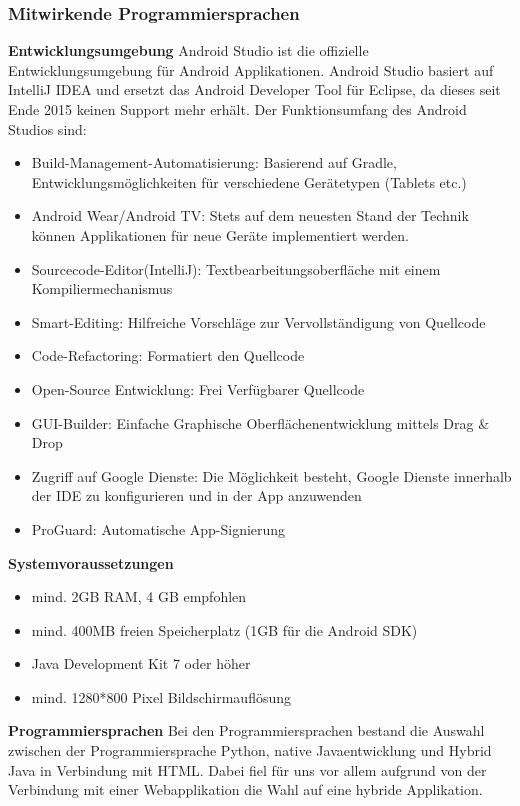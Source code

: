 \subsubsection{Mitwirkende Programmiersprachen}
\label{subsec:androidsprachen}
\textbf{Entwicklungsumgebung\newline}
Android Studio ist die offizielle Entwicklungsumgebung für Android Applikationen.
Android Studio basiert auf IntelliJ IDEA und ersetzt das Android Developer Tool für Eclipse, da dieses seit Ende
2015 keinen Support mehr erhält. Der Funktionsumfang des Android Studios sind:
\begin{itemize}
\item Build-Management-Automatisierung: Basierend auf Gradle, Entwicklungsmöglichkeiten für verschiedene Gerätetypen (Tablets etc.)
\item Android Wear/Android TV: Stets auf dem neuesten Stand der Technik können Applikationen für neue Geräte implementiert werden.
\item Sourcecode-Editor(IntelliJ): Textbearbeitungsoberfläche mit einem Kompiliermechanismus
\item Smart-Editing: Hilfreiche Vorschläge zur Vervollständigung von Quellcode
\item Code-Refactoring: Formatiert den Quellcode
\item Open-Source Entwicklung: Frei Verfügbarer Quellcode
\item GUI-Builder: Einfache Graphische Oberflächenentwicklung mittels Drag \& Drop
\item Zugriff auf Google Dienste: Die Möglichkeit besteht, Google Dienste innerhalb der IDE zu konfigurieren und in der App anzuwenden
\item ProGuard: Automatische App-Signierung
\end{itemize}

\textbf{Systemvoraussetzungen\newline}
\begin{itemize}
\item mind. 2GB RAM, 4 GB empfohlen
\item mind. 400MB freien Speicherplatz (1GB für die Android SDK)
\item Java Development Kit 7 oder höher
\item mind. 1280*800 Pixel Bildschirmauflösung

\end{itemize}
\textbf{Programmiersprachen\newline}
Bei den Programmiersprachen bestand die Auswahl zwischen der Programmiersprache Python, 
native Javaentwicklung und Hybrid Java in Verbindung mit HTML.
Dabei fiel für uns vor allem aufgrund von der Verbindung mit einer Webapplikation die Wahl auf eine hybride Applikation. 
 


